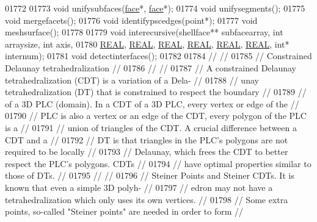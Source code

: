 \begin{DoxyCode}
01772 
01773   \textcolor{keywordtype}{void} unifysubfaces(\hyperlink{classtetgenmesh_1_1face}{face}*, \hyperlink{classtetgenmesh_1_1face}{face}*);
01774   \textcolor{keywordtype}{void} unifysegments();
01775   \textcolor{keywordtype}{void} mergefacets();
01776   \textcolor{keywordtype}{void} identifypscedges(point*);
01777   \textcolor{keywordtype}{void} meshsurface();
01778 
01779   \textcolor{keywordtype}{void} interecursive(shellface** subfacearray, \textcolor{keywordtype}{int} arraysize, \textcolor{keywordtype}{int} axis,
01780                      \hyperlink{tetgen_8h_a4b654506f18b8bfd61ad2a29a7e38c25}{REAL}, \hyperlink{tetgen_8h_a4b654506f18b8bfd61ad2a29a7e38c25}{REAL}, \hyperlink{tetgen_8h_a4b654506f18b8bfd61ad2a29a7e38c25}{REAL}, \hyperlink{tetgen_8h_a4b654506f18b8bfd61ad2a29a7e38c25}{REAL}, \hyperlink{tetgen_8h_a4b654506f18b8bfd61ad2a29a7e38c25}{REAL}, \hyperlink{tetgen_8h_a4b654506f18b8bfd61ad2a29a7e38c25}{REAL}, \textcolor{keywordtype}{int}* internum);
01781   \textcolor{keywordtype}{void} detectinterfaces();
01782 
01784 \textcolor{comment}{//                                                                           //}
01785 \textcolor{comment}{// Constrained Delaunay tetrahedralization                                   //}
01786 \textcolor{comment}{//                                                                           //}
01787 \textcolor{comment}{// A constrained Delaunay tetrahedralization (CDT) is a variation of a Dela- //}
01788 \textcolor{comment}{// unay tetrahedralization (DT) that is constrained to respect the boundary  //}
01789 \textcolor{comment}{// of a 3D PLC (domain). In a CDT of a 3D PLC, every vertex or edge of the   //}
01790 \textcolor{comment}{// PLC is also a vertex or an edge of the CDT, every polygon of the PLC is a //}
01791 \textcolor{comment}{// union of triangles of the CDT. A crucial difference between a CDT and a   //}
01792 \textcolor{comment}{// DT is that triangles in the PLC's polygons are not required to be locally //}
01793 \textcolor{comment}{// Delaunay, which frees the CDT to better respect the PLC's polygons. CDTs  //}
01794 \textcolor{comment}{// have optimal properties similar to those of DTs.                          //}
01795 \textcolor{comment}{//                                                                           //}
01796 \textcolor{comment}{// Steiner Points and Steiner CDTs. It is known that even a simple 3D polyh- //}
01797 \textcolor{comment}{// edron may not have a tetrahedralization which only uses its own vertices. //}
01798 \textcolor{comment}{// Some extra points, so-called "Steiner points" are needed in order to form //}

\end{DoxyCode}
